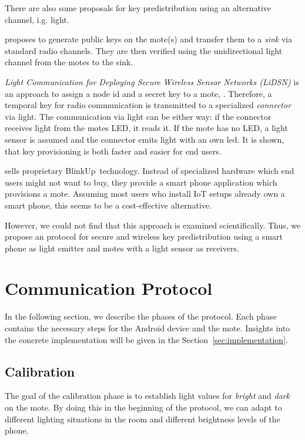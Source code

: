 \documentclass{sig-alternate} %
\begin{document}
There are also some proposals for key predistribution using an alternative channel, i.g. light.

\cite{saxena2009blink} proposes to generate public keys on the mote(s) and transfer them to a \textit{sink} via standard radio channels.
They are then verified using the unidirectional light channel from the motes to the sink.

\textit{Light Communication for Deploying Secure Wireless Sensor Networks (LiDSN)} is an approach to assign a node id and a secret key to a mote, \cite{doan2012lidsn}.
Therefore, a temporal key for radio communication is transmitted to a specialized \textit{connector} via light.
The communication via light can be either way: if the connector receives light from the motes LED, it reads it. If the mote has no LED, a light sensor is assumed and the connector emits light with an own led.
It is shown, that key provisioning is both faster and easier for end users.

\cite{electricimp} sells proprietary BlinkUp~\texttrademark  technology.
Instead of specialized hardware which end users might not want to buy, they provide a smart phone application which provisions a mote.
Assuming most users who install IoT setups already own a smart phone, this seems to be a cost-effective alternative.

However, we could not find that this approach is examined scientifically.
Thus, we propose an protocol for secure and wireless key predistribution using a smart phone as light emitter and motes with a light sensor as receivers.

\section{Communication Protocol}
\label{sec:communication_protocol}

In the following section, we describe the phases of the protocol.
Each phase contains the necessary steps for the Android device and the mote.
Insights into the concrete implementation will be given in the Section~\ref{sec:implementation}.

\subsection{Calibration}
\label{sub:calibration}

The goal of the calibration phase is to establish light values for \textit{bright} and \textit{dark} on the mote.
By doing this in the beginning of the protocol, we can adapt to different lighting situations in the room and different brightness levels of the phone.
\end{document}
